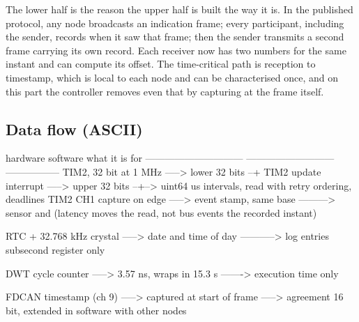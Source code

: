 The lower half is the reason the upper half is built the way it is. In the
published protocol, any node broadcasts an indication frame; every participant,
including the sender, records when it saw that frame; then the sender transmits
a second frame carrying its own record. Each receiver now has two numbers for
the same instant and can compute its offset. The time-critical path is reception
to timestamp, which is local to each node and can be characterised once, and on
this part the controller removes even that by capturing at the frame itself.


\subsection*{Data flow (ASCII)}

\begin{asciiart}
  hardware                        software                     what it is for
  ------------------------------  ---------------------------  -----------------
  TIM2, 32 bit at 1 MHz    -----> lower 32 bits  --+
  TIM2 update interrupt    -----> upper 32 bits  --+--> uint64 us   intervals,
                                  read with retry                   ordering,
                                                                    deadlines
  TIM2 CH1 capture on edge -----> event stamp, same base ---------> sensor and
                                  (latency moves the read, not      bus events
                                   the recorded instant)

  RTC + 32.768 kHz crystal -----> date and time of day -----------> log entries
                                  subsecond register                 only

  DWT cycle counter        -----> 3.57 ns, wraps in 15.3 s -------> execution
                                                                    time only

  FDCAN timestamp (ch 9)   -----> captured at start of frame -----> agreement
                                  16 bit, extended in software      with other
                                                                    nodes
\end{asciiart}

